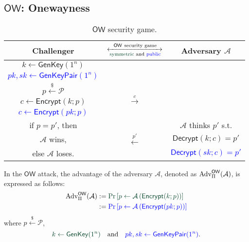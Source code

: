 \documentclass[12pt,openany]{book}
\theoremstyle{definition}
\newcommand{\of}[1]{\left( #1 \right)}
\newcommand{\dollar}{\$}
\newcommand{\uniform}{\xleftarrow{\dollar}}
\newcommand{\A}{\mathcal{A}}
\newcommand{\OW}{\mathsf{OW}}
\newcommand{\Adv}{\textnormal{Adv}}
\newcommand{\GenKey}{\mathsf{GenKey}}
\newcommand{\GenKeyPair}{\mathsf{GenKeyPair}}
\newcommand{\Encrypt}{\mathsf{Encrypt}}
\newcommand{\Decrypt}{\mathsf{Decrypt}}
\begin{document}
	\subsection{$\OW$: Onewayness}
	\begin{table}[h]
		\centering\begin{tabular}{ccc}
			\toprule[1.5pt]
			Challenger & $\xleftrightarrow[\textnormal{\textcolor{britishracinggreen}{symmetric} and \textcolor{blue}{public}}]{\OW\ \textnormal{security game}}$ & Adversary $\mathcal{A}$\\
			\midrule
			\textcolor{britishracinggreen}{$k\gets\GenKey(1^n)$}\\
			\textcolor{blue}{$pk, sk\gets\GenKeyPair(1^n)$}\\
			\midrule
			$p\uniform\mathcal{P}$ & \multirow{3}{*}{$\xrightarrow{c}$} \\
			\textcolor{britishracinggreen}{$c\gets\Encrypt(k;p)$}\\
			\textcolor{blue}{$c\gets\Encrypt(pk;p)$}\\
			\midrule
			if $p=p'$, then & \multirow{3}{*}{$\xleftarrow{p'}$} & $\A$ thinks $p'$ s.t.\\
			$\mathcal{A}$ wins, & & \textcolor{britishracinggreen}{$\Decrypt(k;c)=p'$}\\
			else $\mathcal{A}$ loses. & & \textcolor{blue}{$\Decrypt(sk;c)=p'$} \\
			\bottomrule[1.5pt]
		\end{tabular}
		\caption{$\OW$ security game.}
	\end{table}
	In the $\OW$ attack, the advantage of the adversary $\A$, denoted as $\Adv_{\Pi}^{\OW}(\A)$, is expressed as follows: \begin{align*}
		\Adv_{\Pi}^{\OW}(\A)&:=\textcolor{britishracinggreen}{\Pr\left[p\gets\A\of{\Encrypt(k;p)}\right]}\\
		&:=\textcolor{blue}{\Pr\left[p\gets\A\of{\Encrypt(pk;p)}\right]}
	\end{align*} where $p\uniform\mathcal{P}$, \[
	\textcolor{britishracinggreen}{k\gets\GenKey(1^n)}\quad\text{and}\quad\textcolor{blue}{pk,sk\gets\GenKeyPair(1^n)}.
	\]
	
	\newpage
\end{document}
